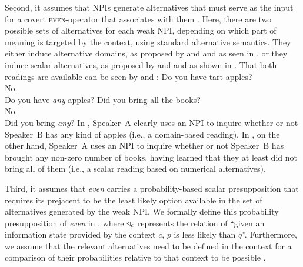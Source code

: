 Second, it assumes that NPIs generate alternatives that must serve as the input for a covert {\scshape even}-operator that associates with them \parencite{Krifka1995,Crnic2011,Crnic2014-dogma,Crnic2014-nm,Chierchia2013}. Here, there are two possible sets of alternatives for each weak NPI, depending on which part of meaning is targeted by the context, using standard  alternative semantics. They either induce alternative domains, as proposed by \textcite{Krifka1995} and \textcite{Chierchia2013} and as seen in , or they induce scalar alternatives, as proposed by \textcite{Lee1994} and \textcite{Lahiri1998} and as shown in .
\ex
\resizebox{0.923\linewidth}{!}{}
\xe
\ex
\resizebox{0.923\linewidth}{!}{}
\xe
That both readings are available can be seen by  and :
\ex
{}Do you have tart apples?\\
No.\\
Do you have \emph{any} apples?\hfill\parencite[p.~14]{Jeong2021}
\xe
\ex
{}Did you bring all the books?\\
No.\\
Did you bring \emph{any}?\hfill\parencite[p.~14]{Jeong2021}
\xe
In , Speaker~A clearly uses an NPI to inquire whether or not Speaker~B has any kind of apples (i.e., a domain-based reading). In , on the other hand, Speaker~A uses an NPI to inquire whether or not Speaker~B has brought any non-zero number of books, having learned that they at least did not bring all of them (i.e., a scalar reading based on numerical alternatives).

Third, it assumes that \textit{even} carries a probability-based scalar presupposition that requires its prejacent to be the least likely option available in the set of alternatives generated by the weak NPI. We formally define this probability presupposition of \textit{even} in , where $\triangleleft_c$ represents the relation of \enquote{given an information state provided by the context $c$, $p$ is less likely than $q$}. Furthermore, we assume that the relevant alternatives need to be defined in the context for a comparison of their probabilities relative to that context to be possible \parencite[p.~118]{Crnic2014-dogma}.
\ex
{}
\xe

